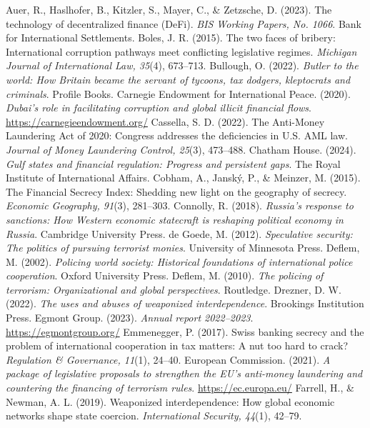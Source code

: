 
\begin{referencelist}
   Auer, R., Haslhofer, B., Kitzler, S., Mayer, C., \& Zetzsche, D. (2023). The technology of decentralized finance (DeFi). \emph{BIS Working Papers, No. 1066}. Bank for International Settlements.
   Boles, J. R. (2015). The two faces of bribery: International corruption pathways meet conflicting legislative regimes. \emph{Michigan Journal of International Law, 35}(4), 673–713.
   Bullough, O. (2022). \emph{Butler to the world: How Britain became the servant of tycoons, tax dodgers, kleptocrats and criminals}. Profile Books.
   Carnegie Endowment for International Peace. (2020). \emph{Dubai's role in facilitating corruption and global illicit financial flows}. \url{https://carnegieendowment.org/}
   Cassella, S. D. (2022). The Anti-Money Laundering Act of 2020: Congress addresses the deficiencies in U.S. AML law. \emph{Journal of Money Laundering Control, 25}(3), 473–488.
   Chatham House. (2024). \emph{Gulf states and financial regulation: Progress and persistent gaps}. The Royal Institute of International Affairs.
   Cobham, A., Janský, P., \& Meinzer, M. (2015). The Financial Secrecy Index: Shedding new light on the geography of secrecy. \emph{Economic Geography, 91}(3), 281–303.
   Connolly, R. (2018). \emph{Russia's response to sanctions: How Western economic statecraft is reshaping political economy in Russia}. Cambridge University Press.
   de Goede, M. (2012). \emph{Speculative security: The politics of pursuing terrorist monies}. University of Minnesota Press.
   Deflem, M. (2002). \emph{Policing world society: Historical foundations of international police cooperation}. Oxford University Press.
   Deflem, M. (2010). \emph{The policing of terrorism: Organizational and global perspectives}. Routledge.
   Drezner, D. W. (2022). \emph{The uses and abuses of weaponized interdependence}. Brookings Institution Press.
   Egmont Group. (2023). \emph{Annual report 2022–2023}. \url{https://egmontgroup.org/}
   Emmenegger, P. (2017). Swiss banking secrecy and the problem of international cooperation in tax matters: A nut too hard to crack? \emph{Regulation \& Governance, 11}(1), 24–40.
   European Commission. (2021). \emph{A package of legislative proposals to strengthen the EU's anti-money laundering and countering the financing of terrorism rules}. \url{https://ec.europa.eu/}
   Farrell, H., \& Newman, A. L. (2019). Weaponized interdependence: How global economic networks shape state coercion. \emph{International Security, 44}(1), 42–79.

\end{referencelist}
